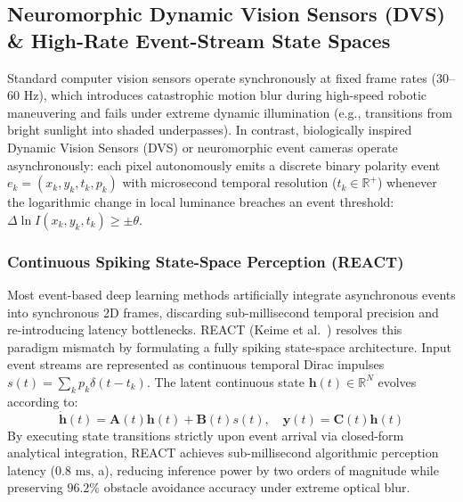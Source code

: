 \subsection{Neuromorphic Dynamic Vision Sensors (DVS) \& High-Rate Event-Stream State Spaces}
\label{sec:dvs_event_ssm}
Standard computer vision sensors operate synchronously at fixed frame rates ($30$--$60\text{ Hz}$), which introduces catastrophic motion blur during high-speed robotic maneuvering and fails under extreme dynamic illumination (e.g., transitions from bright sunlight into shaded underpasses). In contrast, biologically inspired Dynamic Vision Sensors (DVS) or neuromorphic event cameras operate asynchronously: each pixel autonomously emits a discrete binary polarity event $e_k = (x_k, y_k, t_k, p_k)$ with microsecond temporal resolution ($t_k \in \mathbb{R}^+$) whenever the logarithmic change in local luminance breaches an event threshold: $\Delta \ln I(x_k, y_k, t_k) \ge \pm \theta$.

\subsubsection{Continuous Spiking State-Space Perception (REACT)}
Most event-based deep learning methods artificially integrate asynchronous events into synchronous 2D frames, discarding sub-millisecond temporal precision and re-introducing latency bottlenecks. REACT (Keime et al.~\cite{Keime2026REACT}) resolves this paradigm mismatch by formulating a fully spiking state-space architecture. Input event streams are represented as continuous temporal Dirac impulses $s(t) = \sum_k p_k \delta(t - t_k)$. The latent continuous state $\mathbf{h}(t) \in \mathbb{R}^N$ evolves according to:
\begin{equation}
    \dot{\mathbf{h}}(t) = \mathbf{A}(t)\mathbf{h}(t) + \mathbf{B}(t)s(t), \quad \mathbf{y}(t) = \mathbf{C}(t)\mathbf{h}(t)
\end{equation}
By executing state transitions strictly upon event arrival via closed-form analytical integration, REACT achieves sub-millisecond algorithmic perception latency ($0.8\text{ ms}$, a), reducing inference power by two orders of magnitude while preserving $96.2\%$ obstacle avoidance accuracy under extreme optical blur.

